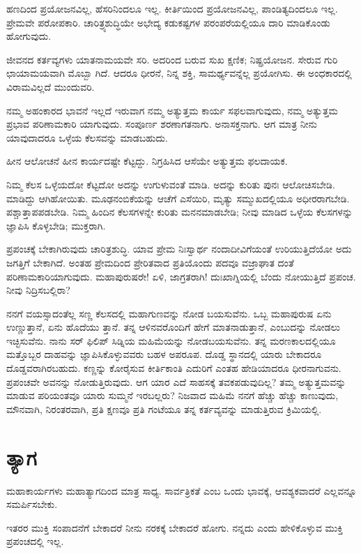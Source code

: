 ಹಣದಿಂದ ಪ್ರಯೋಜನವಿಲ್ಲ, ಹೆಸರಿನಿಂದಲೂ ಇಲ್ಲ. ಕೀರ್ತಿಯಿಂದ ಪ್ರಯೋಜನವಿಲ್ಲ, ಪಾಂಡಿತ್ಯದಿಂದಲೂ ಇಲ್ಲ. ಪ್ರೇಮವೇ ಪರೋಪಕಾರಿ. ಚಾರಿತ್ರ್ಯಶುದ್ಧಿಯೇ ಅಭೇದ್ಯ ಕಡುಕಷ್ಟಗಳ ಪರಂಪರೆಯಲ್ಲಿಯೂ ದಾರಿ ಮಾಡಿಕೊಂಡು ಹೋಗುವುದು.

ಜೀವನದ ಕರ್ತವ್ಯಗಳು ಯಾತನಾಮಯವೇ ಸರಿ. ಅದರಿಂದ ಬರುವ ಸುಖ ಕ್ಷಣಿಕ; ನಿಷ್ಪ್ರಯೋಜನ. ಸೇರುವ ಗುರಿ ಛಾಯಾಮಯವಾಗಿ ಮೊಬ್ಬಾ ಗಿದೆ. ಆದರೂ ಧೀರನೆ, ನಿನ್ನ ಶಕ್ತಿ, ಸಾಮರ್ಥ್ಯವನ್ನೆಲ್ಲ ಪ್ರಯೋಗಿಸು. ಈ ಅಂಧಕಾರದಲ್ಲಿ ವಿರಾಮವಿಲ್ಲದೆ ಮುಂದುವರಿ.

ನಮ್ಮ ಅಹಂಕಾರದ ಭಾವನೆ ಇಲ್ಲದೆ ಇರುವಾಗ ನಮ್ಮ ಅತ್ಯುತ್ತಮ ಕಾರ್ಯ ಸಫಲವಾಗುವುದು, ನಮ್ಮ ಅತ್ಯುತ್ತಮ ಪ್ರಭಾವ ಪರಿಣಾಮಕಾರಿ ಯಾಗುವುದು. ಸಂಪೂರ್ಣ ಶರಣಾಗತನಾಗು. ಅನಾಸಕ್ತನಾಗು. ಆಗ ಮಾತ್ರ ನೀನು ಯಾವುದಾದರೂ ಒಳ್ಳೆಯ ಕೆಲಸವನ್ನು ಮಾಡಬಹುದು.

ಹೀನ ಆಲೋಚನೆ ಹೀನ ಕಾರ್ಯದಷ್ಟೇ ಕೆಟ್ಟದ್ದು. ನಿಗ್ರಹಿಸಿದ ಆಸೆಯೇ ಅತ್ಯುತ್ತಮ ಫಲದಾಯಕ. 

ನಿಮ್ಮ ಕೆಲಸ ಒಳ್ಳೆಯದೋ ಕೆಟ್ಟದೋ ಅದನ್ನು ಉಗುಳುವಂತೆ ಮಾಡಿ. ಅದನ್ನು ಕುರಿತು ಪುನಃ ಆಲೋಚಿಸಬೇಡಿ. ಮಾಡಿದ್ದು ಆಗಿಹೋಯಿತು. ಮೂಢನಂಬಿಕೆಯನ್ನು ಆಚೆಗೆ ಎಸೆಯಿರಿ, ಮೃತ್ಯು ಸಮ್ಮುಖದಲ್ಲಿಯೂ ಅಧೀರರಾಗಬೇಡಿ. ಪಶ್ಚಾತ್ತಾಪಪಡಬೇಡಿ. ನಿಮ್ಮ ಹಿಂದಿನ ಕೆಲಸಗಳನ್ನೇ ಕುರಿತು ಮನನಮಾಡಬೇಡಿ; ನೀವು ಮಾಡಿದ ಒಳ್ಳೆಯ ಕೆಲಸಗಳನ್ನು ಜ್ಞಾಪಿಸಿ ಕೊಳ್ಳಬೇಡಿ; ಮುಕ್ತರಾಗಿ.

ಪ್ರಪಂಚಕ್ಕೆ ಬೇಕಾಗಿರುವುದು ಚಾರಿತ್ರಶುದ್ಧಿ. ಯಾವ ಪ್ರೇಮ ನಿಃಸ್ವಾರ್ಥ ನಂದಾದೀವಿಗೆಯಂತೆ ಉರಿಯುತ್ತಿದೆಯೋ ಅದು ಜಗತ್ತಿಗೆ ಬೇಕಾಗಿದೆ. ಅಂತಹ ಪ್ರೇಮದಿಂದ ಪ್ರೇರಿತವಾದ ಪ್ರತಿಯೊಂದು ಪದವೂ ವಜ್ರಾಘಾತ ದಂತೆ ಪರಿಣಾಮಕಾರಿಯಾಗುವುದು. ಮಹಾಪುರುಷರೇ! ಏಳಿ, ಜಾಗ್ರತರಾಗಿ! ದುಃಖಾಗ್ನಿಯಲ್ಲಿ ಬೆಂದು ನೋಯುತ್ತಿದೆ ಪ್ರಪಂಚ. ನೀವು ನಿದ್ರಿಸಬಲ್ಲಿರಾ?

ನನಗೆ ವಯಸ್ಸಾದಂತೆಲ್ಲ ಸಣ್ಣ ಕೆಲಸದಲ್ಲಿ ಮಹಾಗುಣವನ್ನು ನೋಡ ಬಯಸುವೆನು. ಒಬ್ಬ ಮಹಾಪುರುಷ ಏನು ಉಣ್ಣುತ್ತಾನೆ, ಏನು ಹೊದೆಯು ತ್ತಾನೆ. ತನ್ನ ಆಳಿನವರೊಂದಿಗೆ ಹೇಗೆ ಮಾತನಾಡುತ್ತಾನೆ, ಎಂಬುದನ್ನು ನೋಡಲು ಇಚ್ಛಿಸುವೆನು. ನಾನು ಸರ್ ಫಿಲಿಪ್ ಸಿಡ್ನಿಯ ಮಹಿಮೆಯನ್ನು ನೋಡಬಯಸುವೆನು. ತನ್ನ ಮರಣಕಾಲದಲ್ಲಿಯೂ ಮತ್ತೊಬ್ಬರ ದಾಹವನ್ನು ಜ್ಞಾಪಿಸಿಕೊಳ್ಳುವವರು ಬಹಳ ಅಪರೂಪ. ದೊಡ್ಡ ಸ್ಥಾನದಲ್ಲಿ ಯಾರು ಬೇಕಾದರೂ ದೊಡ್ಡವರಾಗಿರಬಹುದು. ಕಣ್ಣನ್ನು ಕೋರೈಸುವ ಕೀರ್ತಿಕಾಂತಿ ಎದುರಿಗೆ ಎಂತಹ ಹೇಡಿಯಾದರೂ ಧೀರನಾಗುವನು. ಪ್ರಪಂಚವೇ ಅವನನ್ನು ನೋಡುತ್ತಿರುವುದು. ಆಗ ಯಾರ ಎದೆ ಸಾಹಸಕ್ಕೆ ತವಕಪಡುವುದಿಲ್ಲ? ತಮ್ಮ ಅತ್ಯುತ್ತಮವನ್ನು ಮಾಡುವ ಪರಿಯಂತವೂ ಯಾರು ಸುಮ್ಮನೆ ಇರಬಲ್ಲರು? ನಿಜವಾದ ಮಹಿಮೆ ನನಗೆ ಹೆಚ್ಚು ಹೆಚ್ಚು ಕಾಣುವುದು, ಮೌನವಾಗಿ, ನಿರಂತರವಾಗಿ, ಪ್ರತಿ ಕ್ಷಣವೂ ಪ್ರತಿ ಗಂಟೆಯೂ ತನ್ನ ಕರ್ತವ್ಯವನ್ನು ಮಾಡುತ್ತಿರುವ ಕ್ರಿಮಿಯಲ್ಲಿ.


\section{ತ್ಯಾಗ}

ಮಹಾಕಾರ್ಯಗಳು ಮಹಾತ್ಯಾಗದಿಂದ ಮಾತ್ರ ಸಾಧ್ಯ. ಸಾರ್ವತ್ರಿಕತೆ ಎಂಬ ಒಂದು ಭಾವಕ್ಕೆ, ಆವಶ್ಯಕವಾದರೆ ಎಲ್ಲವನ್ನೂ ಸಮರ್ಪಿಸಬೇಕು.

ಇತರರ ಮುಕ್ತಿ ಸಂಪಾದನೆಗೆ ಬೇಕಾದರೆ ನೀನು ನರಕಕ್ಕೆ ಬೇಕಾದರೆ ಹೋಗು. ನನ್ನದು ಎಂದು ಹೇಳಿಕೊಳ್ಳುವ ಮುಕ್ತಿ ಪ್ರಪಂಚದಲ್ಲಿ ಇಲ್ಲ.


